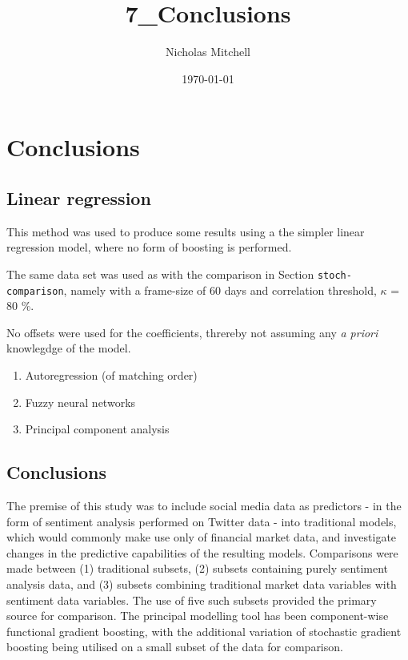 \documentclass{article}
\author{Nicholas Mitchell}
\date{\today}
\title{7\_Conclusions}
\begin{document}
\maketitle
\tableofcontents

\pagebreak


\section{Conclusions \label{results-summary} \label{conclusions}}
\label{sec-1}


\subsection{Linear regression}
\label{sec-1-1}

This method was used to produce some results using a the simpler linear regression model, where no form of boosting is performed.

The same data set was used as with the comparison in Section \texttt{stoch-comparison}, namely with a frame-size of 60 days and correlation threshold, $\kappa$ = 80 \%. 

No offsets were used for the coefficients, threreby not assuming any \emph{a priori} knowlegdge of the model.








\begin{enumerate}
\item Autoregression (of matching order)

\item Fuzzy neural networks

\item Principal component analysis
\end{enumerate}


\subsection{Conclusions \label{results_summary}}
\label{sec-1-2}

The premise of this study was to include social media data as predictors - in the form of sentiment analysis performed on Twitter data - into traditional models, which would commonly make use only of financial market data, and investigate changes in the predictive capabilities of the resulting models. Comparisons were made between (1) traditional subsets, (2) subsets containing purely sentiment analysis data, and (3) subsets combining traditional market data variables with sentiment data variables. The use of five such subsets provided the primary source for comparison. The principal modelling tool has been component-wise functional gradient boosting, with the additional variation of stochastic gradient boosting being utilised on a small subset of the data for comparison.
\end{document}
